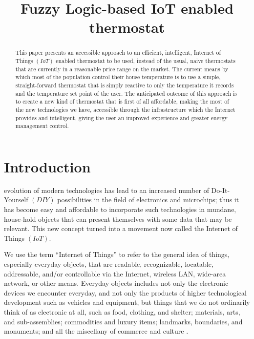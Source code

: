 \documentclass[conference]{IEEEtran}
\let\Oldsection\section
\renewcommand{\section}{\FloatBarrier\Oldsection}
\begin{document}
\title{Fuzzy Logic-based IoT enabled thermostat}


\author{
}

\maketitle


\begin{abstract}

This paper presents an accessible approach to an efficient, intelligent, Internet of Things $(IoT)$ enabled
thermostat to be used, instead of the usual, naive thermostats that are currently in a reasonable price range
on the market. The current means by which most of the population control their house temperature is to use a
simple, straight-forward thermostat that is simply reactive to only the temperature it records and the
temperature set point of the user. The anticipated outcome of this approach is to create a new kind of
thermostat that is first of all affordable, making the most of the new technologies we have, accessible through
the infrastructure which the Internet provides and intelligent, giving the user an improved experience and
greater energy management control.

\end{abstract}


\section{Introduction}
\label{Introduction}

\The evolution of modern technologies has lead to an increased number of Do-It-Yourself $(DIY)$ possibilities in
the field of electronics and microchips; thus it has become easy and affordable to incorporate such
technologies in mundane, house-hold objects that can present themselves with some data that may be relevant.
This new concept turned into a movement now called the Internet of Things $(IoT)$.

We use the term “Internet of Things” to refer to the general idea of things, especially everyday objects, that
are readable, recognizable, locatable, addressable, and/or controllable via the Internet,
wireless LAN, wide-area network, or other means. Everyday objects includes not only the electronic devices we
encounter everyday, and not only the products of higher technological development such as vehicles and
equipment, but things that we do not ordinarily think of as electronic at all, such as food, clothing, and
shelter; materials, arts, and sub-assemblies; commodities and luxury items; landmarks, boundaries,
and monuments; and all the miscellany of commerce and culture \cite{DisruptiveCivilTechnologies}
\cite{DisruptiveCivilTechnologiesAppendix}.
\end{document}
